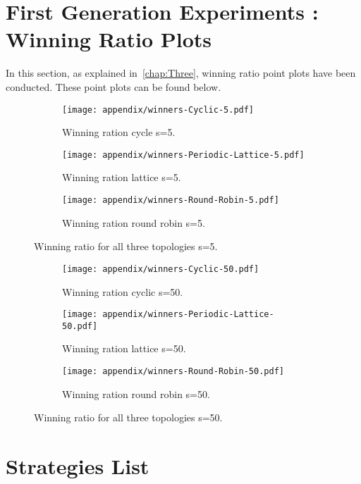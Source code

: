 \section{First Generation Experiments :  Winning Ratio Plots}
\label{append:wining-ratio-further-plot}
In this section, as explained in~\ref{chap:Three}, winning ratio point plots
have been conducted. These point plots can be found below.
\begin{figure}[H]
\centering
    \begin{subfigure}[t]{0.8\textwidth}
    \centering
        \texttt{[image: appendix/winners-Cyclic-5.pdf]}
    \caption{Winning ration cycle s=5.}
    \end{subfigure}
\hfill
    \begin{subfigure}[t]{0.8\textwidth}\centering
    \centering
        \texttt{[image: appendix/winners-Periodic-Lattice-5.pdf]}
    \caption{Winning ration lattice s=5.}
    \end{subfigure}
\hfill
    \begin{subfigure}[t]{0.8\textwidth}\centering
    \centering
        \texttt{[image: appendix/winners-Round-Robin-5.pdf]}
    \caption{Winning ration round robin s=5.}
    \end{subfigure}
\caption{Winning ratio for all three topologies s=5.}
\label{fig:winning-five}

\end{figure}

\begin{figure}[H]
\centering
    \begin{subfigure}[t]{0.8\textwidth}
    \centering
        \texttt{[image: appendix/winners-Cyclic-50.pdf]}
    \caption{Winning ration cyclic s=50.}
    \end{subfigure}
\hfill
    \begin{subfigure}[t]{0.8\textwidth}\centering
    \centering
        \texttt{[image: appendix/winners-Periodic-Lattice-50.pdf]}
    \caption{Winning ration lattice s=50.}
    \end{subfigure}
\hfill
    \begin{subfigure}[t]{0.8\textwidth}\centering
    \centering
        \texttt{[image: appendix/winners-Round-Robin-50.pdf]}
    \caption{Winning ration round robin s=50.}
    \end{subfigure}
\caption{Winning ratio for all three topologies s=50.}
\label{fig:winning-fifty}
\end{figure}

\section{Strategies List}
